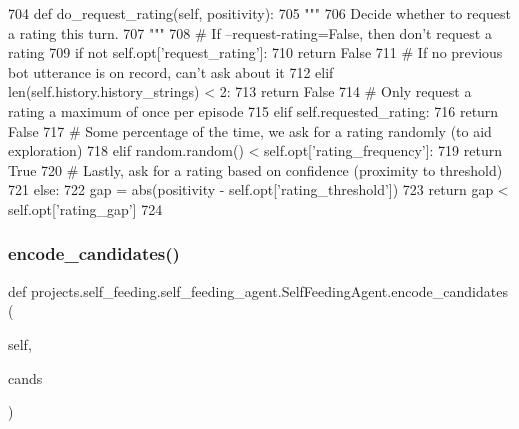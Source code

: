 \begin{DoxyCode}
704     \textcolor{keyword}{def }do\_request\_rating(self, positivity):
705         \textcolor{stringliteral}{"""}
706 \textcolor{stringliteral}{        Decide whether to request a rating this turn.}
707 \textcolor{stringliteral}{        """}
708         \textcolor{comment}{# If --request-rating=False, then don't request a rating}
709         \textcolor{keywordflow}{if} \textcolor{keywordflow}{not} self.opt[\textcolor{stringliteral}{'request\_rating'}]:
710             \textcolor{keywordflow}{return} \textcolor{keyword}{False}
711         \textcolor{comment}{# If no previous bot utterance is on record, can't ask about it}
712         \textcolor{keywordflow}{elif} len(self.history.history\_strings) < 2:
713             \textcolor{keywordflow}{return} \textcolor{keyword}{False}
714         \textcolor{comment}{# Only request a rating a maximum of once per episode}
715         \textcolor{keywordflow}{elif} self.requested\_rating:
716             \textcolor{keywordflow}{return} \textcolor{keyword}{False}
717         \textcolor{comment}{# Some percentage of the time, we ask for a rating randomly (to aid exploration)}
718         \textcolor{keywordflow}{elif} random.random() < self.opt[\textcolor{stringliteral}{'rating\_frequency'}]:
719             \textcolor{keywordflow}{return} \textcolor{keyword}{True}
720         \textcolor{comment}{# Lastly, ask for a rating based on confidence (proximity to threshold)}
721         \textcolor{keywordflow}{else}:
722             gap = abs(positivity - self.opt[\textcolor{stringliteral}{'rating\_threshold'}])
723             \textcolor{keywordflow}{return} gap < self.opt[\textcolor{stringliteral}{'rating\_gap'}]
724 
\end{DoxyCode}
\mbox{\label{classprojects_1_1self__feeding_1_1self__feeding__agent_1_1SelfFeedingAgent_a3208c69de4a2452cafa3d7feeec85218}} 
\subsubsection{\texorpdfstring{encode\+\_\+candidates()}{encode\_candidates()}}
{\footnotesize\ttfamily def projects.\+self\+\_\+feeding.\+self\+\_\+feeding\+\_\+agent.\+Self\+Feeding\+Agent.\+encode\+\_\+candidates (\begin{DoxyParamCaption}\item[{}]{self,  }\item[{}]{cands }\end{DoxyParamCaption})}

